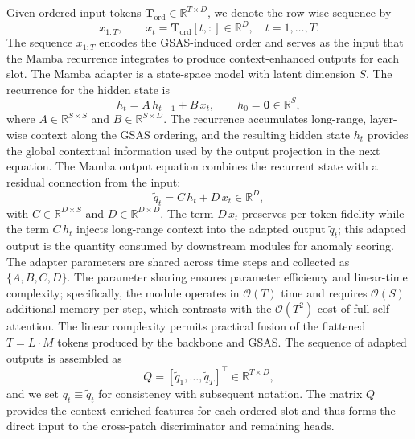 Given ordered input tokens \(\mathbf{T}_{\mathrm{ord}}\in\mathbb{R}^{T\times D}\), we denote the row-wise sequence by
\begin{equation}
x_{1:T},\qquad x_t=\mathbf{T}_{\mathrm{ord}}[t,:]\in\mathbb{R}^D,\quad t=1,\dots,T.
\end{equation}
The sequence \(x_{1:T}\) encodes the GSAS-induced order and serves as the input that the Mamba recurrence integrates to produce context-enhanced outputs for each slot. The Mamba adapter is a state-space model with latent dimension \(S\). The recurrence for the hidden state is
\begin{equation}
h_t = A\,h_{t-1} + B\,x_t,\qquad h_0=\mathbf{0}\in\mathbb{R}^S,
\end{equation}
where \(A\in\mathbb{R}^{S\times S}\) and \(B\in\mathbb{R}^{S\times D}\). The recurrence accumulates long-range, layer-wise context along the GSAS ordering, and the resulting hidden state \(h_t\) provides the global contextual information used by the output projection in the next equation. The Mamba output equation combines the recurrent state with a residual connection from the input:
\begin{equation}
\tilde{q}_t = C\,h_t + D\,x_t \in\mathbb{R}^D,
\end{equation}
with \(C\in\mathbb{R}^{D\times S}\) and \(D\in\mathbb{R}^{D\times D}\). The term \(D\,x_t\) preserves per-token fidelity while the term \(C\,h_t\) injects long-range context into the adapted output \(\tilde{q}_t\); this adapted output is the quantity consumed by downstream modules for anomaly scoring. The adapter parameters are shared across time steps and collected as \(\{A,B,C,D\}\). The parameter sharing ensures parameter efficiency and linear-time complexity; specifically, the module operates in \(\mathcal{O}(T)\) time and requires \(\mathcal{O}(S)\) additional memory per step, which contrasts with the \(\mathcal{O}(T^2)\) cost of full self-attention. The linear complexity permits practical fusion of the flattened \(T=L\cdot M\) tokens produced by the backbone and GSAS. The sequence of adapted outputs is assembled as
\begin{equation}
Q=[\tilde{q}_1,\dots,\tilde{q}_T]^\top\in\mathbb{R}^{T\times D},
\end{equation}
and we set \(q_t\equiv\tilde{q}_t\) for consistency with subsequent notation. The matrix \(Q\) provides the context-enriched features for each ordered slot and thus forms the direct input to the cross-patch discriminator and remaining heads.

